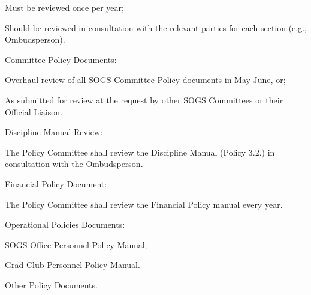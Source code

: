 \begin{longenum}[ label*=\thesubsection.\arabic*., align=left]
\begin{longenum}[label*=\arabic*., align=left]
\begin{longenum}[label*=\arabic*., align=left]
		\item Must be reviewed once per year;
		\item Should be reviewed in consultation with the relevant parties for each section (e.g., Ombudsperson).
		\end{longenum}
	\item Committee Policy Documents:
		\begin{longenum}[label*=\arabic*., align=left]	
		\item Overhaul review of all SOGS Committee Policy documents in May-June, or;
		\item As submitted for review at the request by other SOGS Committees or their Official Liaison.
		\end{longenum}
	\item Discipline Manual Review:
		\begin{longenum}[label*=\arabic*., align=left]	
		\item The Policy Committee shall review the Discipline Manual (Policy 3.2.) in consultation with the Ombudsperson.
		\end{longenum}
	\item Financial Policy Document:
		\begin{longenum}[label*=\arabic*., align=left]	
		\item The Policy Committee shall review the Financial Policy manual every year.
		\end{longenum}
	\item Operational Policies Documents:
		\begin{longenum}[label*=\arabic*., align=left]	
		\item SOGS Office Personnel Policy Manual; 
		\item Grad Club Personnel Policy Manual.
		\end{longenum}
	\item Other Policy Documents.
	\end{longenum}
\end{longenum}	